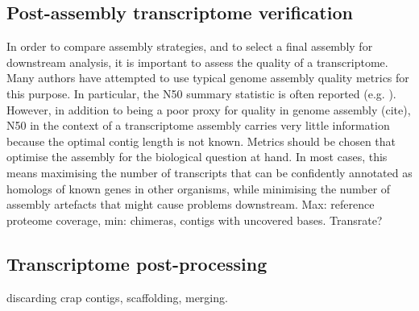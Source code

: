 \subsection{Post-assembly transcriptome verification}
In order to compare assembly strategies, and to select a final assembly for downstream analysis, it is important to assess the quality of a transcriptome. Many authors have attempted to use typical genome assembly quality metrics for this purpose. In particular, the N50 summary statistic is often reported (e.g. \citep{Hiz:2014ep,Shinzato:2014hx,Liang:2013fm}). However, in addition to being a poor proxy for quality in genome assembly (cite), N50 in the context of a transcriptome assembly carries very little information because the optimal contig length is not known. Metrics should be chosen that optimise the assembly for the biological question at hand. In most cases, this means maximising the number of transcripts that can be confidently annotated as homologs of known genes in other organisms, while minimising the number of assembly artefacts that might cause problems downstream. Max: reference proteome coverage, min: chimeras, contigs with uncovered bases. Transrate?

\subsection{Transcriptome post-processing}
discarding crap contigs, scaffolding, merging.